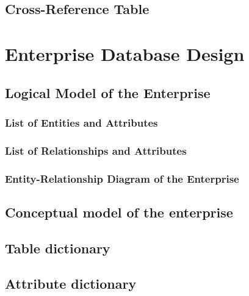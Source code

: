 \documentclass[11pt]{report}
\begin{document}
\section{Cross-Reference Table}

\chapter{Enterprise Database Design}

\section{Logical Model of the Enterprise}
\subsection{List of Entities and Attributes}
\subsection{List of Relationships and Attributes}
\subsection{Entity-Relationship Diagram of the Enterprise}

\section{Conceptual model of the enterprise}
\section{Table dictionary}
\section{Attribute dictionary}
\end{document}
